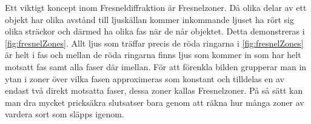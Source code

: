 \documentclass[a4paper]{article}
\begin{document}
Ett viktigt koncept inom Fresneldiffraktion är Fresnelzoner. Då olika delar av ett objekt har olika avstånd till ljuskällan kommer inkommande ljuset ha rört sig olika sträckor och därmed ha olika fas när de når objektet. Detta demonstreras i \autoref{fig:fresnelZones}. Allt ljus som träffar precis de röda ringarna i \autoref{fig:fresnelZones} är helt i fas och mellan de röda ringarna finns ljus som kommer in som har helt motsatt fas samt alla faser där imellan. För att förenkla bilden grupperar man in ytan i zoner över vilka fasen approximeras som konstant och tilldelas en av endast två direkt motsatta faser, dessa zoner kallas Fresnelzoner. På så sätt kan man dra mycket pricksäkra slutsatser bara genom att räkna hur många zoner av vardera sort som släpps igenom. \cite{pearsonIntroOpt}

\end{document}
